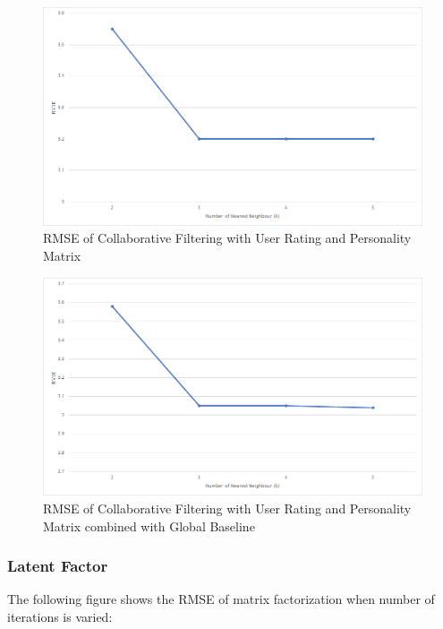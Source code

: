 \begin{figure}[!ht]
  \centering
    \includegraphics[width=1\textwidth]{fig/rmse_cf_average.png}
    \caption{RMSE of Collaborative Filtering with User Rating and Personality Matrix}
\end{figure}

\begin{figure}[!ht]
  \centering
    \includegraphics[width=1\textwidth]{fig/rmse_cf_combined_average.png}
    \caption{RMSE of Collaborative Filtering with User Rating and Personality Matrix combined with Global Baseline}
\end{figure}


\cleardoublepage
\subsubsection{Latent Factor}
The following figure shows the RMSE of matrix factorization when number of iterations is varied:

